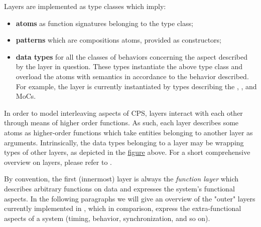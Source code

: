  \par
                 Layers are implemented as type classes which imply:\par
                 \begin{itemize}
                 \item
                 \textbf{atoms} as function signatures belonging to the type class;\par
                 
                 \item
                 \textbf{patterns} which are compositions atoms, provided as constructors;\par
                 
                 \item
                 \textbf{data types} for all the classes of behaviors concerning the
 aspect described by the layer in question. These types
 instantiate the above type class and overload the atoms with
 semantics in accordance to the behavior described. For example,
 the  layer is currently instantiated by
 types describing the ,
 ,  and
  MoCs.\par
                 
                 \end{itemize}
                 In order to model interleaving aspects of CPS, layers interact
 with each other through means of higher order functions. As such,
 each layer describes some atoms as higher-order functions which
 take entities belonging to another layer as arguments.
 Intrinsically, the data types belonging to a layer may be wrapping
 types of other layers, as depicted in the \hyperref[layered-model]{figure}
 above. For a short comprehensive overview on layers, please refer
 to \cite{Ungureanu17}.\par
                 By convention, the first (innermost) layer is always the
 \emph{function layer} which describes arbitrary functions on data and
 expresses the system's functional aspects. In the following
 paragraphs we will give an overview of the "outer" layers
 currently implemented in , which in comparison,
 express the extra-functional aspects of a system (timing,
 behavior, synchronization, and so on).\par
                 
